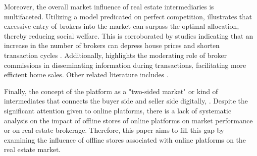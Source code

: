 \documentclass[11pt]{article}
\begin{document}
Moreover, the overall market influence of real estate intermediaries is multifaceted. Utilizing a model predicated on perfect competition, \citet{williams_agency_1998} illustrates that excessive entry of brokers into the market can surpass the optimal allocation, thereby reducing social welfare. This is corroborated by studies indicating that an increase in the number of brokers can depress house prices and shorten transaction cycles \citep{https://doi.org/10.1002/jae.2891}. Additionally, \citet{qu_identifying_2021} highlights the moderating role of broker commissions in disseminating information during transactions, facilitating more efficient home sales. Other related literature includes \citep{doi:10.1080/10527001.2021.2016340, doi:10.1080/10835547.1996.12090852}.

Finally, the concept of the platform as a "two-sided market" or kind of intermediates that connects the buyer side and seller side digitally, \citep{10.1162/154247603322493212, Langley_Leyshon_2017}. Despite the significant attention given to online platforms, there is a lack of systematic analysis on the impact of offline stores of online platforms on market performance or on real estate brokerage. Therefore, this paper aims to fill this gap by examining the influence of offline stores associated with online platforms on the real estate market.


\end{document}
